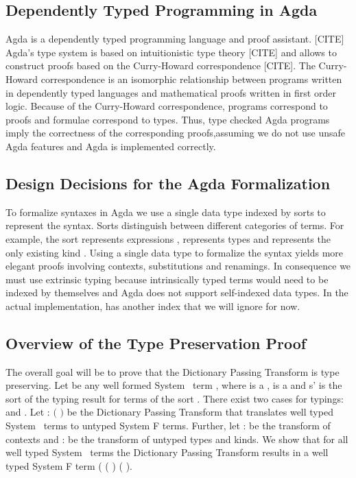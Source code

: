 \subsection{Dependently Typed Programming in Agda}
Agda is a dependently typed programming language and proof assistant. [CITE]
Agda's type system is based on intuitionistic type theory [CITE] and allows to construct proofs based on the Curry-Howard correspondence [CITE]. 
The Curry-Howard correspondence is an isomorphic relationship between programs written in dependently typed languages and mathematical proofs written in first order logic. 
Because of the Curry-Howard correspondence, programs correspond to proofs and formulae correspond to types. 
Thus, type checked Agda programs imply the correctness of the corresponding proofs,assuming we do not use unsafe Agda features and Agda is implemented correctly. 

\subsection{Design Decisions for the Agda Formalization}
To formalize syntaxes in Agda we use a single data type  indexed by sorts  to represent the syntax. 
Sorts distinguish between different categories of terms. 
For example, the sort  represents expressions ,  represents types  and  represents the only existing kind . 
Using a single data type to formalize the syntax yields more elegant proofs involving contexts, substitutions and renamings. 
In consequence we must use extrinsic typing because intrinsically typed terms      would need to be indexed by themselves and Agda does not support self-indexed data types. 
In the actual implementation,  has another index  that we will ignore for now.

\subsection{Overview of the Type Preservation Proof}
The overall goal will be to prove that the Dictionary Passing Transform is type preserving. Let  be any well formed System \Fo\ term    \Constr{:} , where  is a  ,  is a   and s' is the sort of the typing result for terms of the sort . There exist two cases for typings:    \Constr{:}  and    \Constr{:} . Let  : $($   \Constr{:} $)$    be the Dictionary Passing Transform that translates well typed System \Fo\ terms to untyped System F terms. Further, let  :    be the transform of contexts and  :      be the transform of untyped types and kinds. We show that for all well typed System \Fo\  terms  the Dictionary Passing Transform results in a well typed System F term (   ( ) \Constr{:} ( ). 

